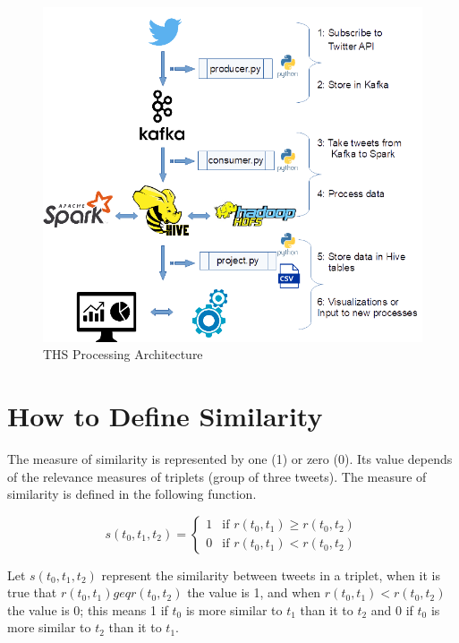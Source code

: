\documentclass[12pt]{report}
\begin{document}
\begin{figure}[H]	
	\centering
	\includegraphics[width=150mm, scale = 1]{images/6_ths_system.png}	
	\caption{\ac{THS} Processing Architecture}	
	\label{figure:ths_system}
\end{figure}

\section{How to Define Similarity}

The measure of similarity is represented by one (1) or zero (0). Its value depends of the relevance measures of triplets (group of three tweets). The measure of similarity is defined in the following function.

\begin{equation}
s(t_0, t_1, t_2) = 
	\begin{cases} 
		1 		& \text{if } r(t_0, t_1) \geq r(t_0, t_2) \\	
		0 		& \text{if } r(t_0, t_1) < r(t_0, t_2)
	\end{cases}
\end{equation}

\noindent Let $s(t_0, t_1, t_2)$ represent the similarity between  tweets in a triplet, when it is true that $r(t_0, t_1) geq r(t_0,t_2)$ the value is 1, and when $r(t_0, t_1) < r(t_0,t_2)$ the value is 0; this means 1 if  $t_0$ is more similar to $t_1$ than it to $t_2$ and  0  if $t_0$ is more similar to $t_2$ than it to $t_1$.
\end{document}
